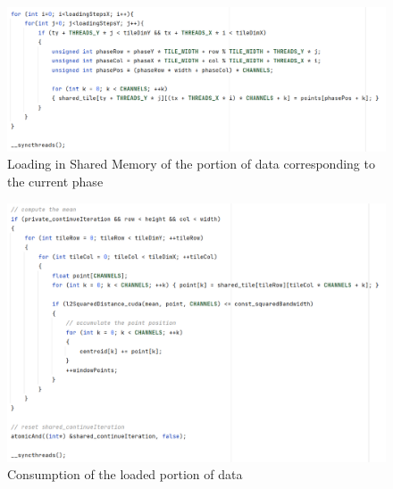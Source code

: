\documentclass{article}
\begin{document}
\newpage

\vspace{30px}

\begin{figure}[!h]
\centering
\includegraphics[width= 12cm]{"Immagini/shared-load.PNG"}
\caption{Loading in Shared Memory of the portion of data corresponding to the current phase}
\label{shared-load}
\end{figure}

\vspace{30px}

\begin{figure}[!h]
\centering
\includegraphics[width= 12cm]{"Immagini/shared-consume.PNG"}
\caption{Consumption of the loaded portion of data}
\label{shared-consume}
\end{figure}

\newpage 

\vspace{30px}
\end{document}
